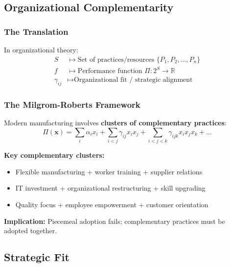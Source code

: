 \subsection{Organizational Complementarity}

\subsubsection{The Translation}

\begin{axiom}
In organizational theory:
\begin{align}
S &\mapsto \text{Set of practices/resources } \{P_1, P_2, \ldots, P_n\} \\
f &\mapsto \text{Performance function } \Pi: 2^S \to \mathbb{R} \\
\gamma_{ij} &\mapsto \text{Organizational fit / strategic alignment}
\end{align}
\end{axiom}

\subsubsection{The Milgrom-Roberts Framework}

\begin{tcolorbox}[colback=blue!5!white,colframe=blue!75!black,title=\textbf{Milgrom \& Roberts (1990, 1995): Organizational Complementarities}]
Modern manufacturing involves \textbf{clusters of complementary practices}:
\begin{equation}
\Pi(\mathbf{x}) = \sum_i \alpha_i x_i + \sum_{i < j} \gamma_{ij} x_i x_j + \sum_{i < j < k} \gamma_{ijk} x_i x_j x_k + \ldots
\end{equation}

\textbf{Key complementary clusters:}
\begin{itemize}[noitemsep]
    \item Flexible manufacturing + worker training + supplier relations
    \item IT investment + organizational restructuring + skill upgrading
    \item Quality focus + employee empowerment + customer orientation
\end{itemize}

\textbf{Implication:} Piecemeal adoption fails; complementary practices must be adopted together.
\end{tcolorbox}

\subsection{Strategic Fit}

